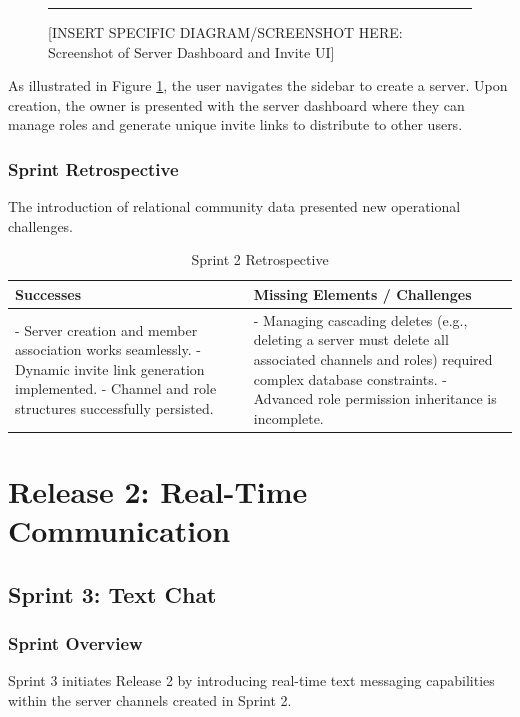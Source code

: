 \begin{figure}[h!]
    \centering
    \rule{0.8\textwidth}{5cm} %
    \caption{[INSERT SPECIFIC DIAGRAM/SCREENSHOT HERE: Screenshot of Server Dashboard and Invite UI]}
    \label{fig:sprint2_ui}
\end{figure}

As illustrated in Figure \ref{fig:sprint2_ui}, the user navigates the sidebar to create a server. Upon creation, the owner is presented with the server dashboard where they can manage roles and generate unique invite links to distribute to other users.

\subsection{Sprint Retrospective}
The introduction of relational community data presented new operational challenges.

\begin{table}[h!]
    \centering
    \begin{tabular}{|p{7cm}|p{7cm}|}
        \hline
        \textbf{Successes} & \textbf{Missing Elements / Challenges} \\
        \hline
        - Server creation and member association works seamlessly. \newline - Dynamic invite link generation implemented. \newline - Channel and role structures successfully persisted. & - Managing cascading deletes (e.g., deleting a server must delete all associated channels and roles) required complex database constraints. \newline - Advanced role permission inheritance is incomplete. \\
        \hline
    \end{tabular}
    \caption{Sprint 2 Retrospective}
    \label{tab:sprint2_retro}
\end{table}


\chapter{Release 2: Real-Time Communication}

\section{Sprint 3: Text Chat}

\subsection{Sprint Overview}
Sprint 3 initiates Release 2 by introducing real-time text messaging capabilities within the server channels created in Sprint 2.

